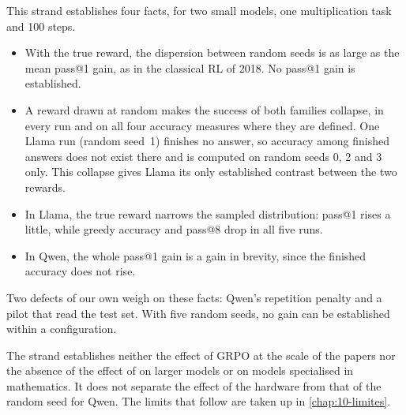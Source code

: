 This strand establishes four facts, for two small models, one multiplication task and 100 steps.
\begin{itemize}
  \item With the true reward, the dispersion between random seeds is as large as the mean pass@1 gain, as in
    the classical RL of 2018. No pass@1 gain is established.
  \item A reward drawn at random makes the success of both families collapse, in every run and on all
    four accuracy measures where they are defined. One Llama run (random seed~1) finishes no answer, so
    accuracy among finished answers does not exist there and is computed on random seeds 0, 2 and 3 only.
    This collapse gives Llama its only established contrast between the two rewards.
  \item In Llama, the true reward narrows the sampled distribution: pass@1 rises a little, while greedy
    accuracy and pass@8 drop in all five runs.
  \item In Qwen, the whole pass@1 gain is a gain in brevity, since the finished accuracy does not rise.
\end{itemize}
Two defects of our own weigh on these facts: Qwen's repetition penalty and a pilot that read the test
set. With five random seeds, no gain can be established within a configuration. 

The strand establishes neither the effect of GRPO at the scale of the papers nor the absence of the
effect of \textcite{shao2025spurious} on larger models or on models specialised in mathematics. It does
not separate the effect of the hardware from that of the random seed for Qwen. The limits that follow
are taken up in \cref{chap:10-limites}.
